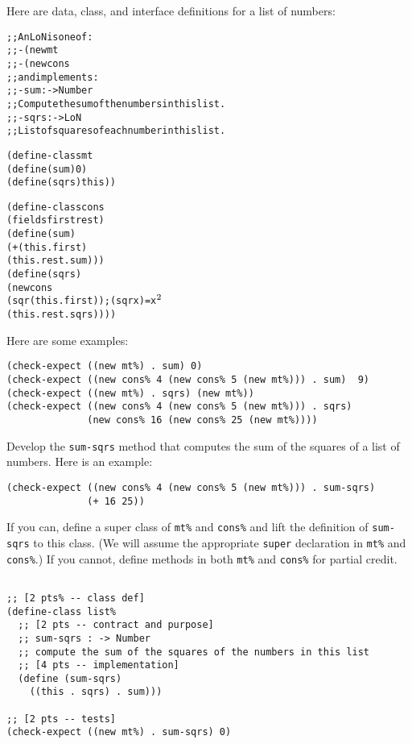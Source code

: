 \documentclass[12pt]{article}                   %
\def\pts#1{\marginpar{\footnotesize \raggedright  \fbox{#1 {\sc Points}}}}
\newenvironment{solution}{}{}
\begin{document}
\begin{problem}\pts{10}

Here are data, class, and interface definitions for a list of numbers:
\begin{alltt}
;; An LoN is one of:
;; - (new mt%)
;; - (new cons% Number LoN)
;; and implements:
;; - sum : -> Number
;;   Compute the sum of the numbers in this list.
;; - sqrs : -> LoN
;;   List of squares of each number in this list.

(define-class mt%
  (define (sum) 0)
  (define (sqrs) this))

(define-class cons%
  (fields first rest)
  (define (sum)
    (+ (this . first)
       (this . rest . sum)))
  (define (sqrs)
    (new cons% 
         (sqr (this . first)) ; (sqr x) = x\(\sp{2}\)
         (this . rest . sqrs))))
\end{alltt}
%
Here are some examples:
\begin{verbatim}
(check-expect ((new mt%) . sum) 0)
(check-expect ((new cons% 4 (new cons% 5 (new mt%))) . sum)  9)
(check-expect ((new mt%) . sqrs) (new mt%))
(check-expect ((new cons% 4 (new cons% 5 (new mt%))) . sqrs)
              (new cons% 16 (new cons% 25 (new mt%))))
\end{verbatim}

\newpage
\noindent
Develop the \verb|sum-sqrs| method that computes the sum of the
squares of a list of numbers.  Here is an example:
\begin{verbatim}
(check-expect ((new cons% 4 (new cons% 5 (new mt%))) . sum-sqrs) 
              (+ 16 25))
\end{verbatim}

If you can, define a super class of \verb|mt%| and \verb|cons%| and
lift the definition of \verb|sum-sqrs| to this class.  (We will assume
the appropriate \verb|super| declaration in \verb|mt%| and
\verb|cons%|.)  If you cannot, define methods in both \verb|mt%| and
\verb|cons%| for partial credit.

\begin{solution}
\begin{verbatim}

;; [2 pts% -- class def]
(define-class list%
  ;; [2 pts -- contract and purpose]
  ;; sum-sqrs : -> Number
  ;; compute the sum of the squares of the numbers in this list
  ;; [4 pts -- implementation]
  (define (sum-sqrs)
    ((this . sqrs) . sum)))

;; [2 pts -- tests]
(check-expect ((new mt%) . sum-sqrs) 0)
\end{verbatim}
\end{solution}

\newpage

\end{problem}
\end{document}
